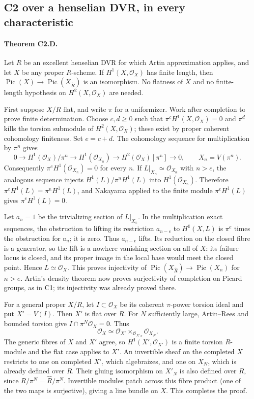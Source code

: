 \subsection{C2 over a henselian DVR, in every characteristic}

\paragraph{Theorem C2.D.}
Let $R$ be an excellent henselian DVR for which Artin approximation applies,
and let $X$ be any proper $R$-scheme. If $H^1(X,\mathcal O_X)$ has finite
length, then $\operatorname{Pic}(X)\to\operatorname{Pic}(X_{\widehat R})$
is an isomorphism. No flatness of $X$ and no finite-length hypothesis on
$H^2(X,\mathcal O_X)$ are needed.

First suppose $X/R$ flat, and write $\pi$ for a uniformizer. Work after
completion to prove finite determination. Choose $c,d\ge0$ such that
$\pi^c H^1(X,\mathcal O_X)=0$ and $\pi^d$ kills the torsion submodule of
$H^2(X,\mathcal O_X)$; these exist by proper coherent cohomology finiteness.
Set $e=c+d$. The cohomology sequence for multiplication by $\pi^n$ gives
\[
 0\longrightarrow H^1(\mathcal O_X)/\pi^n
 \longrightarrow H^1(\mathcal O_{X_n})
 \longrightarrow H^2(\mathcal O_X)[\pi^n]\longrightarrow0,
 \qquad X_n=V(\pi^n).
\]
Consequently $\pi^e H^1(\mathcal O_{X_n})=0$ for every $n$.
If $L|_{X_n}\simeq\mathcal O_{X_n}$ with $n>e$, the analogous sequence
injects $H^1(L)/\pi^n H^1(L)$ into $H^1(\mathcal O_{X_n})$. Therefore
$\pi^e H^1(L)=\pi^nH^1(L)$, and Nakayama applied to the finite module
$\pi^eH^1(L)$ gives $\pi^eH^1(L)=0$.

Let $a_n=1$ be the trivializing section of $L|_{X_n}$. In the multiplication
exact sequences, the obstruction to lifting its restriction $a_{n-e}$ to
$H^0(X,L)$ is $\pi^e$ times the obstruction for $a_n$; it is zero. Thus
$a_{n-e}$ lifts. Its reduction on the closed fibre is a generator, so the
lift is a nowhere-vanishing section on all of $X$: its failure locus is
closed, and its proper image in the local base would meet the closed point.
Hence $L\simeq\mathcal O_X$. This proves injectivity of
$\operatorname{Pic}(X_{\widehat R})\to\operatorname{Pic}(X_n)$ for $n>e$.
Artin's density theorem now proves surjectivity of completion on Picard
groups, as in C1; its injectivity was already proved there.

For a general proper $X/R$, let $I\subset\mathcal O_X$ be its coherent
$\pi$-power torsion ideal and put $X'=V(I)$. Then $X'$ is flat over $R$.
For $N$ sufficiently large, Artin--Rees and bounded torsion give
$I\cap\pi^N\mathcal O_X=0$. Thus
\[
 \mathcal O_X\simeq
 \mathcal O_{X'}\times_{\mathcal O_{X'_N}}\mathcal O_{X_N}.
\]
The generic fibres of $X$ and $X'$ agree, so $H^1(X',\mathcal O_{X'})$
is a finite torsion $R$-module and the flat case applies to $X'$.
An invertible sheaf on the completed $X$ restricts to one on completed
$X'$, which algebraizes, and one on $X_N$, which is already defined over
$R$. Their gluing isomorphism on $X'_N$ is also defined over $R$, since
$R/\pi^N=\widehat R/\pi^N$. Invertible modules patch across this fibre
product (one of the two maps is surjective), giving a line bundle on $X$.
This completes the proof.

